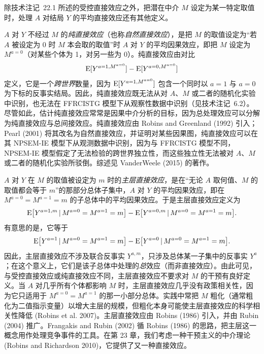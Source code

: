 \begin{techpoint}[纯直接效应与主层直接效应]
除技术注记~22.1 所述的受控直接效应之外，把潜在中介 $M$ 设定为某一特定取值时，处理 $A$ 对结局 $Y$ 的平均直接效应还有其他定义。

$A$ 对 $Y$ 不经过 $M$ 的\emph{纯直接效应}（也称\emph{自然直接效应}），是把 $M$ 的取值设定为“若 $A$ 被设定为 0 时 $M$ 本会取的取值”时 $A$ 对 $Y$ 的平均因果效应，即把 $M$ 设定为 $M^{a=0}$（对某些个体为 1，对另一些为 0）。纯直接效应由对比
\[
\mathrm{E}[Y^{a=1,M^{a=0}}]-\mathrm{E}[Y^{a=0,M^{a=0}}]
\]
定义，它是一个\emph{跨世界}数量，因为 $\mathrm{E}[Y^{a=1,M^{a=0}}]$ 包含一个同时以 $a=1$ 与 $a=0$ 为下标的反事实结局。因此，纯直接效应既无法从对 $A$、$M$ 或二者的随机化实验中识别，也无法在 FFRCISTG 模型下从观察性数据中识别（见技术注记~6.2）。尽管如此，估计纯直接效应常常是因果中介分析的目标，因为总处理效应可以分解为纯直接效应与总间接效应。纯直接效应由 Robins and Greenland (1992) 引入；Pearl (2001) 将其改名为自然直接效应，并证明对某些因果图，纯直接效应可以在其 NPSEM-IE 模型下从观测数据中识别，因为与 FFRCISTG 模型不同，NPSEM-IE 模型假定了无法检验的跨世界独立性，而这些独立性无法被对 $A$、$M$ 或二者的随机化实验所驳倒。综述见 VanderWeele (2015) 的著作。

$A$ 对 $Y$ 在 $M$ 的取值被设定为 $m$ 时的\emph{主层直接效应}，是在“无论 $A$ 取何值、$M$ 的取值都会等于 $m$”的那部分总体子集中，$A$ 对 $Y$ 的平均因果效应，即在 $M^{a=0}=M^{a=1}=m$ 的子总体中的平均因果效应。于是主层直接效应定义为
\[
\mathrm{E}\bigl[Y^{a=1,m}\,|\, M^{a=0}=M^{a=1}=m\bigr]-\mathrm{E}\bigl[Y^{a=0,m}\,|\, M^{a=0}=M^{a=1}=m\bigr].
\]
有意思的是，它等于
\[
\mathrm{E}\bigl[Y^{a=1}\,|\, M^{a=0}=M^{a=1}=m\bigr]-\mathrm{E}\bigl[Y^{a=0}\,|\, M^{a=0}=M^{a=1}=m\bigr].
\]
因此，主层直接效应不涉及联合反事实 $Y^{a,m}$，只涉及总体某一子集中的反事实 $Y^{a}$；在这个意义上，它们是该子总体中处理的\emph{总}效应（而非直接效应）。由此可见，与受控直接效应或纯直接效应不同，主层直接效应不要求对 $M$ 的干预有良好定义。当 $A$ 对几乎所有个体都影响 $M$ 时，主层直接效应几乎没有政策相关性，因为它只适用于 $M^{a=0}=M^{a=1}$ 的那一小部分总体。实践中常把 $M$ 粗化（通常粗化为二值指示变量）以增大主层的规模，但粗化本身可能使主层直接效应的科学相关性降低 (Robins et al. 2007)。主层直接效应由 Robins (1986) 引入，并由 Rubin (2004) 推广。Frangakis and Rubin (2002) 循 Robins (1986) 的思路，把主层这一概念用作处理竞争事件的工具。在第 23 章，我们考虑一种干预主义的中介理论 (Robins and Richardson 2010)，它提供了又一种直接效应。
\end{techpoint}

